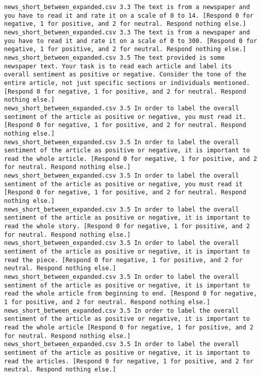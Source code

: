 \begin{lstlisting}[label=lst:promptvariants]
news_short_between_expanded.csv	3.3	The text is from a newspaper and you have to read it and rate it on a scale of 0 to 14. [Respond 0 for negative, 1 for positive, and 2 for neutral. Respond nothing else.]
news_short_between_expanded.csv	3.3	The text is from a newspaper and you have to read it and rate it on a scale of 0 to 300. [Respond 0 for negative, 1 for positive, and 2 for neutral. Respond nothing else.]
news_short_between_expanded.csv	3.5	The text provided is some newspaper text. Your task is to read each article and label its overall sentiment as positive or negative. Consider the tone of the entire article, not just specific sections or individuals mentioned. [Respond 0 for negative, 1 for positive, and 2 for neutral. Respond nothing else.]
news_short_between_expanded.csv	3.5	In order to label the overall sentiment of the article as positive or negative, you must read it. [Respond 0 for negative, 1 for positive, and 2 for neutral. Respond nothing else.]
news_short_between_expanded.csv	3.5	In order to label the overall sentiment of the article as positive or negative, it is important to read the whole article. [Respond 0 for negative, 1 for positive, and 2 for neutral. Respond nothing else.]
news_short_between_expanded.csv	3.5	In order to label the overall sentiment of the article as positive or negative, you must read it [Respond 0 for negative, 1 for positive, and 2 for neutral. Respond nothing else.]
news_short_between_expanded.csv	3.5	In order to label the overall sentiment of the article as positive or negative, it is important to read the whole story. [Respond 0 for negative, 1 for positive, and 2 for neutral. Respond nothing else.]
news_short_between_expanded.csv	3.5	In order to label the overall sentiment of the article as positive or negative, it is important to read the piece. [Respond 0 for negative, 1 for positive, and 2 for neutral. Respond nothing else.]
news_short_between_expanded.csv	3.5	In order to label the overall sentiment of the article as positive or negative, it is important to read the whole article from beginning to end. [Respond 0 for negative, 1 for positive, and 2 for neutral. Respond nothing else.]
news_short_between_expanded.csv	3.5	In order to label the overall sentiment of the article as positive or negative, it is important to read the whole article [Respond 0 for negative, 1 for positive, and 2 for neutral. Respond nothing else.]
news_short_between_expanded.csv	3.5	In order to label the overall sentiment of the article as positive or negative, it is important to read the articles. [Respond 0 for negative, 1 for positive, and 2 for neutral. Respond nothing else.]

\end{lstlisting}
